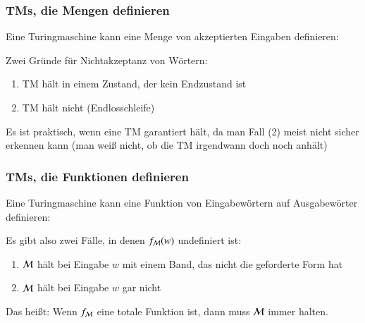 \documentclass[onlymath]{beamer}
\begin{document}

\begin{frame}\frametitle{TMs, die Mengen definieren}

Eine Turingmaschine kann eine Menge von akzeptierten Eingaben definieren:

\pause

Zwei Gründe für Nichtakzeptanz von Wörtern:
\begin{enumerate}[(1)]
\item TM hält in einem Zustand, der kein Endzustand ist
\item TM hält nicht (Endlosschleife)
\end{enumerate}
Es ist praktisch, wenn eine TM garantiert hält, da man Fall (2) meist nicht sicher erkennen kann (man weiß nicht, ob die TM irgendwann doch noch anhält)


\end{frame}

\begin{frame}\frametitle{TMs, die Funktionen definieren}

Eine Turingmaschine kann eine Funktion von Eingabewörtern auf Ausgabewörter definieren:

\pause

Es gibt also zwei Fälle, in denen $f_{\mathcal{M}}(w)$ undefiniert ist:
\begin{enumerate}[(1)]
\item $\mathcal{M}$ hält bei Eingabe $w$ mit einem Band, das nicht die geforderte Form hat
\item $\mathcal{M}$ hält bei Eingabe $w$ gar nicht
\end{enumerate}

Das heißt: Wenn $f_{\mathcal{M}}$ eine totale Funktion ist, dann muss $\mathcal{M}$ immer halten.

\end{frame}
\end{document}
